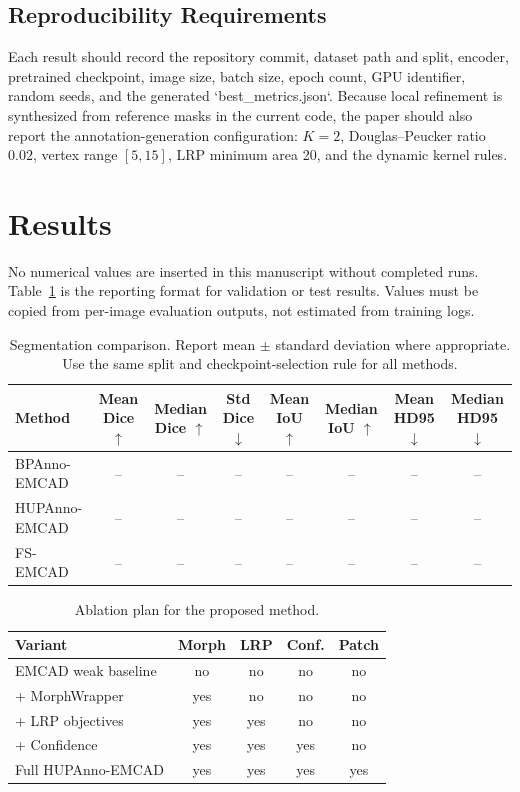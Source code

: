 \documentclass[journal]{IEEEtran}
\newcommand{\method}{HUPAnno-EMCAD}
\newcommand{\bpanno}{BPAnno-EMCAD}
\newcommand{\fs}{FS-EMCAD}
\begin{document}
\subsection{Reproducibility Requirements}
Each result should record the repository commit, dataset path and split, encoder, pretrained checkpoint, image size, batch size, epoch count, GPU identifier, random seeds, and the generated `best_metrics.json`. Because local refinement is synthesized from reference masks in the current code, the paper should also report the annotation-generation configuration: $K=2$, Douglas--Peucker ratio $0.02$, vertex range $[5,15]$, LRP minimum area 20, and the dynamic kernel rules.

\section{Results}
No numerical values are inserted in this manuscript without completed runs. Table~\ref{tab:main-results} is the reporting format for validation or test results. Values must be copied from per-image evaluation outputs, not estimated from training logs.

\begin{table}[t]
\caption{Segmentation comparison. Report mean $\pm$ standard deviation where appropriate. Use the same split and checkpoint-selection rule for all methods.}
\label{tab:main-results}
\centering
\begin{tabular}{lccccccc}
\toprule
Method & Mean Dice $\uparrow$ & Median Dice $\uparrow$ & Std Dice $\downarrow$ & Mean IoU $\uparrow$ & Median IoU $\uparrow$ & Mean HD95 $\downarrow$ & Median HD95 $\downarrow$ \\
\midrule
\bpanno & -- & -- & -- & -- & -- & -- & -- \\
\method & -- & -- & -- & -- & -- & -- & -- \\
\fs & -- & -- & -- & -- & -- & -- & -- \\
\bottomrule
\end{tabular}
\end{table}

\begin{table}[t]
\caption{Ablation plan for the proposed method.}
\label{tab:ablation}
\centering
\begin{tabular}{lcccc}
\toprule
Variant & Morph & LRP & Conf. & Patch \\
\midrule
EMCAD weak baseline & no & no & no & no \\
+ MorphWrapper & yes & no & no & no \\
+ LRP objectives & yes & yes & no & no \\
+ Confidence & yes & yes & yes & no \\
Full \method & yes & yes & yes & yes \\
\bottomrule
\end{tabular}
\end{table}
\end{document}
